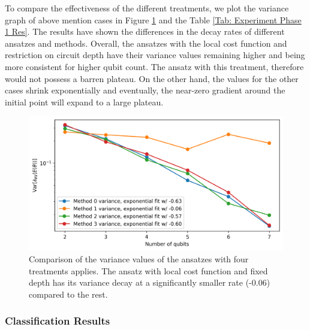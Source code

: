 To compare the effectiveness of the different treatments, we plot the variance graph of above mention cases in Figure \ref{Fig: Plot Variances} and the Table \ref{Tab: Experiment Phase 1 Res}.
The results have shown the differences in the decay rates of different ansatzes and methods.
Overall, the ansatzes with the local cost function and restriction on circuit depth have their variance values remaining higher and being more consistent for higher qubit count.
The ansatz with this treatment, therefore would not possess a barren plateau.
On the other hand, the values for the other cases shrink exponentially and eventually, the near-zero gradient around the initial point will expand to a large plateau.


\begin{figure}
    \includegraphics[width=\textwidth]{Artefact/Appendices/variances.png}
    \caption{
        Comparison of the variance values of the ansatzes with four treatments applies.
        The ansatz with local cost function and fixed depth has its variance decay at a significantly smaller rate (-0.06) compared to the rest.
    }
    \label{Fig: Plot Variances}
\end{figure}


\subsubsection{Classification Results}


